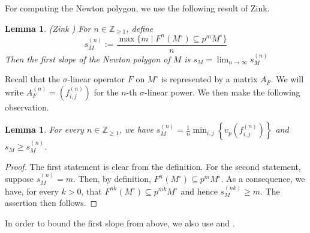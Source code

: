 \documentclass[11pt,table]{amsart}
\numberwithin{equation}{section}
\newtheorem{lem}[thm]{Lemma}
\theoremstyle{definition}
\theoremstyle{remark}
\theoremstyle{remark}
\begin{document}
For computing the Newton polygon, we use the following result of Zink.
\begin{lem}{({\rm Zink} \cite[Lemma 6.12]{Zink})}  \label{lem: Zink} 
For $n\in \mathbb{Z}_{\geq 1}$, define 
\[
s_M^{(n)} := \frac{\max \{m \; | \; F^n (M^\circ) \subseteq p^m M^\circ\}}{n}
\]
Then the first slope of the Newton polygon of $M$ is $s_M=\displaystyle \lim_{n\to \infty} s_M^{(n)}$
\end{lem}
Recall that the $\sigma$-linear operator $F$ on $M^\circ$ is represented by a matrix $A_F$. We will write $A_F^{(n)}=(f_{i,j}^{(n)})$ for the $n$-th $\sigma$-linear power. We then make the following observation.
\begin{lem} \label{lem: Zink+} 
For every $n\in \mathbb{Z}_{\geq 1}$, we have $s_M^{(n)} = \frac{1}{n}\min_{i,j} \left\{v_p\left(f_{i,j}^{(n)}\right)\right\}$ and $s_M \geq s_M^{(n)}$.
\end{lem}
\begin{proof}
The first statement is clear from the definition. For the second statement, suppose $s_M^{(n)}=m$. Then, by definition, $F^n(M^\circ) \subseteq p^m M^\circ$. As a consequence, we have, for every $k>0$, that $F^{nk}(M^\circ) \subseteq p^{mk} M^\circ$ and hence $s_M^{(nk)} \geq m$. The assertion then follows.
\end{proof}

In order to bound the first slope from above, we also use \cite[Theorem 1.2]{Nygaard} and \cite[1.5.1]{Katz}.

\end{document}
